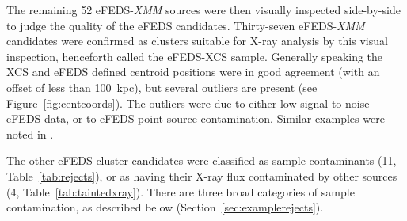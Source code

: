 \documentclass[fleqn,usenatbib]{mnras}
\begin{document}
The remaining 52 eFEDS-{\em XMM} sources were then visually inspected side-by-side to judge the quality of the eFEDS candidates. 
Thirty-seven eFEDS-{\em XMM} candidates were confirmed as clusters suitable for X-ray analysis by this visual inspection, henceforth called the eFEDS-XCS sample. Generally speaking the XCS and eFEDS defined centroid positions were in good agreement (with an offset of less than 100~kpc), but several outliers are present (see Figure~\ref{fig:centcoords}). The outliers were due to either low signal to noise eFEDS data, or to eFEDS point source contamination. Similar examples were noted in \cite{efedsclusteropticalcat}. 

The other eFEDS cluster candidates were classified as sample contaminants (11, Table~\ref{tab:rejects}), or as having their X-ray flux contaminated by other sources (4, Table~\ref{tab:taintedxray}). There are three broad categories of sample contamination, as described below (Section~\ref{sec:examplerejects}).



\end{document}
